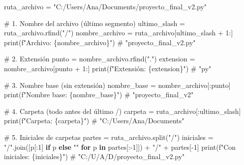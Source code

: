 \documentclass[
  doc,
  floatsintext,
  longtable,
  a4paper,
  nolmodern,
  notxfonts,
  notimes,
  12pt,
  colorlinks=true,linkcolor=blue,citecolor=blue,urlcolor=blue]{apa7}
\newenvironment{Shaded}{\begin{snugshade}}{\end{snugshade}}
\newcommand{\BuiltInTok}[1]{\textcolor[rgb]{0.00,0.23,0.31}{#1}}
\newcommand{\CommentTok}[1]{\textcolor[rgb]{0.37,0.37,0.37}{#1}}
\newcommand{\ControlFlowTok}[1]{\textcolor[rgb]{0.00,0.23,0.31}{\textbf{#1}}}
\newcommand{\DecValTok}[1]{\textcolor[rgb]{0.68,0.00,0.00}{#1}}
\newcommand{\KeywordTok}[1]{\textcolor[rgb]{0.00,0.23,0.31}{\textbf{#1}}}
\newcommand{\NormalTok}[1]{\textcolor[rgb]{0.00,0.23,0.31}{#1}}
\newcommand{\OperatorTok}[1]{\textcolor[rgb]{0.37,0.37,0.37}{#1}}
\newcommand{\SpecialCharTok}[1]{\textcolor[rgb]{0.37,0.37,0.37}{#1}}
\newcommand{\SpecialStringTok}[1]{\textcolor[rgb]{0.13,0.47,0.30}{#1}}
\newcommand{\StringTok}[1]{\textcolor[rgb]{0.13,0.47,0.30}{#1}}
\begin{document}
\begin{Shaded}
\begin{Highlighting}[]
\NormalTok{ruta\_archivo }\OperatorTok{=} \StringTok{"C:/Users/Ana/Documents/proyecto\_final\_v2.py"}

\CommentTok{\# 1. Nombre del archivo (último segmento)}
\NormalTok{ultimo\_slash }\OperatorTok{=}\NormalTok{ ruta\_archivo.rfind(}\StringTok{"/"}\NormalTok{)}
\NormalTok{nombre\_archivo }\OperatorTok{=}\NormalTok{ ruta\_archivo[ultimo\_slash }\OperatorTok{+} \DecValTok{1}\NormalTok{:]}
\BuiltInTok{print}\NormalTok{(}\SpecialStringTok{f"Archivo: }\SpecialCharTok{\{}\NormalTok{nombre\_archivo}\SpecialCharTok{\}}\SpecialStringTok{"}\NormalTok{)  }\CommentTok{\# "proyecto\_final\_v2.py"}

\CommentTok{\# 2. Extensión}
\NormalTok{punto }\OperatorTok{=}\NormalTok{ nombre\_archivo.rfind(}\StringTok{"."}\NormalTok{)}
\NormalTok{extension }\OperatorTok{=}\NormalTok{ nombre\_archivo[punto }\OperatorTok{+} \DecValTok{1}\NormalTok{:]}
\BuiltInTok{print}\NormalTok{(}\SpecialStringTok{f"Extensión: }\SpecialCharTok{\{}\NormalTok{extension}\SpecialCharTok{\}}\SpecialStringTok{"}\NormalTok{)  }\CommentTok{\# "py"}

\CommentTok{\# 3. Nombre base (sin extensión)}
\NormalTok{nombre\_base }\OperatorTok{=}\NormalTok{ nombre\_archivo[:punto]}
\BuiltInTok{print}\NormalTok{(}\SpecialStringTok{f"Nombre base: }\SpecialCharTok{\{}\NormalTok{nombre\_base}\SpecialCharTok{\}}\SpecialStringTok{"}\NormalTok{)  }\CommentTok{\# "proyecto\_final\_v2"}

\CommentTok{\# 4. Carpeta (todo antes del último /)}
\NormalTok{carpeta }\OperatorTok{=}\NormalTok{ ruta\_archivo[:ultimo\_slash]}
\BuiltInTok{print}\NormalTok{(}\SpecialStringTok{f"Carpeta: }\SpecialCharTok{\{}\NormalTok{carpeta}\SpecialCharTok{\}}\SpecialStringTok{"}\NormalTok{)  }\CommentTok{\# "C:/Users/Ana/Documents"}

\CommentTok{\# 5. Iniciales de carpetas}
\NormalTok{partes }\OperatorTok{=}\NormalTok{ ruta\_archivo.split(}\StringTok{"/"}\NormalTok{)}
\NormalTok{iniciales }\OperatorTok{=} \StringTok{"/"}\NormalTok{.join([p[:}\DecValTok{1}\NormalTok{] }\ControlFlowTok{if}\NormalTok{ p }\ControlFlowTok{else} \StringTok{""} \ControlFlowTok{for}\NormalTok{ p }\KeywordTok{in}\NormalTok{ partes[:}\OperatorTok{{-}}\DecValTok{1}\NormalTok{]]) }\OperatorTok{+} \StringTok{"/"} \OperatorTok{+}\NormalTok{ partes[}\OperatorTok{{-}}\DecValTok{1}\NormalTok{]}
\BuiltInTok{print}\NormalTok{(}\SpecialStringTok{f"Con iniciales: }\SpecialCharTok{\{}\NormalTok{iniciales}\SpecialCharTok{\}}\SpecialStringTok{"}\NormalTok{)  }\CommentTok{\# "C:/U/A/D/proyecto\_final\_v2.py"}
\end{Highlighting}
\end{Shaded}
\end{document}
